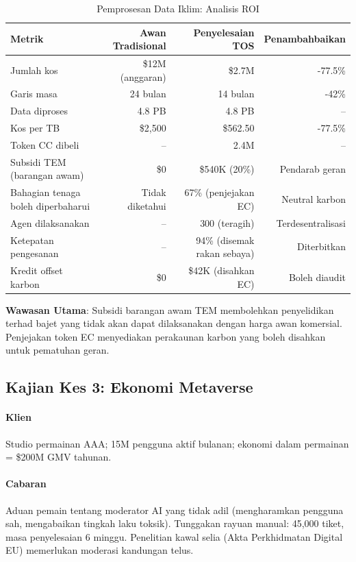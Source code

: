 \documentclass[11pt]{article}
\begin{document}
\begin{table}[H]
\centering
\caption{Pemprosesan Data Iklim: Analisis ROI}
\label{tab:climate-roi}
\begin{tabular}{@{}lrrr@{}}
\toprule
\textbf{Metrik} & \textbf{Awan Tradisional} & \textbf{Penyelesaian TOS} & \textbf{Penambahbaikan} \\ \midrule
Jumlah kos & \$12M (anggaran) & \$2.7M & -77.5\% \\
Garis masa & 24 bulan & 14 bulan & -42\% \\
Data diproses & 4.8 PB & 4.8 PB & -- \\
Kos per TB & \$2,500 & \$562.50 & -77.5\% \\
Token CC dibeli & -- & 2.4M & -- \\
Subsidi TEM (barangan awam) & \$0 & \$540K (20\%) & Pendarab geran \\
Bahagian tenaga boleh diperbaharui & Tidak diketahui & 67\% (penjejakan EC) & Neutral karbon \\
Agen dilaksanakan & -- & 300 (teragih) & Terdesentralisasi \\
Ketepatan pengesanan & -- & 94\% (disemak rakan sebaya) & Diterbitkan \\
Kredit offset karbon & \$0 & \$42K (disahkan EC) & Boleh diaudit \\
\bottomrule
\end{tabular}
\end{table}

\textbf{Wawasan Utama}: Subsidi barangan awam TEM membolehkan penyelidikan terhad bajet yang tidak akan dapat dilaksanakan dengan harga awan komersial. Penjejakan token EC menyediakan perakaunan karbon yang boleh disahkan untuk pematuhan geran.

\subsection{Kajian Kes 3: Ekonomi Metaverse}

\paragraph{Klien} Studio permainan AAA; 15M pengguna aktif bulanan; ekonomi dalam permainan = \$200M GMV tahunan.

\paragraph{Cabaran} Aduan pemain tentang moderator AI yang tidak adil (mengharamkan pengguna sah, mengabaikan tingkah laku toksik). Tunggakan rayuan manual: 45,000 tiket, masa penyelesaian 6 minggu. Penelitian kawal selia (Akta Perkhidmatan Digital EU) memerlukan moderasi kandungan telus.
\end{document}

